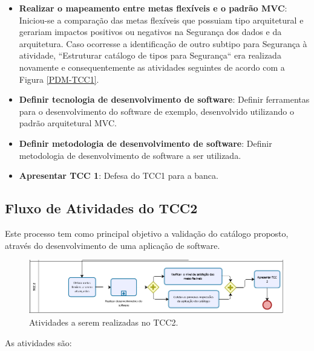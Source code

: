 \begin{itemize}
	\item \textbf{Realizar o mapeamento entre metas flexíveis e o padrão MVC}: Iniciou-se a comparação das metas flexíveis que possuiam tipo arquitetural e gerariam impactos positivos ou negativos na Segurança dos dados e da arquitetura. Caso ocorresse a identificação de outro subtipo para Segurança à atividade, ``Estruturar catálogo de tipos para Segurança`` era realizada novamente e consequentemente as atividades seguintes de acordo com a Figura \ref{PDM-TCC1}. 
	
	\item \textbf{Definir tecnologia de desenvolvimento de software}: Definir ferramentas para o desenvolvimento do software de exemplo, desenvolvido utilizando o padrão arquitetural MVC.
	
	\item \textbf{Definir metodologia de desenvolvimento de software}: Definir metodologia de desenvolvimento de software a ser utilizada.
	
	\item \textbf{Apresentar TCC 1}: Defesa do TCC1 para a banca. 
\end{itemize}

\subsection{Fluxo de Atividades do TCC2}

Este processo tem como principal objetivo a validação do catálogo proposto, através do desenvolvimento de uma aplicação de software. 

\begin{figure}[h!]
	\centering
	\includegraphics[keepaspectratio=true,scale=0.7]{figuras/PDM-TCC2.PNG}
	\caption{Atividades a serem realizadas no TCC2.}
	\label{PDM-TCC2}
\end{figure}

As atividades são:


